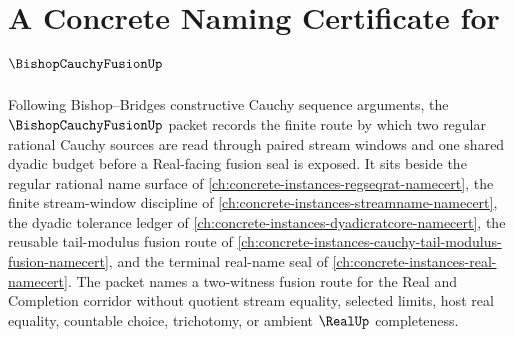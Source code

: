 \chapter{A Concrete Naming Certificate for $\BishopCauchyFusionUp$}
\label{ch:concrete-instances-bishop-cauchy-fusion-namecert}

Following Bishop--Bridges constructive Cauchy sequence arguments, the $\BishopCauchyFusionUp$ packet records the finite route by which two regular rational Cauchy sources are read through paired stream windows and one shared dyadic budget before a Real-facing fusion seal is exposed. It sits beside the regular rational name surface of \autoref{ch:concrete-instances-regseqrat-namecert}, the finite stream-window discipline of \autoref{ch:concrete-instances-streamname-namecert}, the dyadic tolerance ledger of \autoref{ch:concrete-instances-dyadicratcore-namecert}, the reusable tail-modulus fusion route of \autoref{ch:concrete-instances-cauchy-tail-modulus-fusion-namecert}, and the terminal real-name seal of \autoref{ch:concrete-instances-real-namecert}. The packet names a two-witness fusion route for the Real and Completion corridor without quotient stream equality, selected limits, host real equality, countable choice, trichotomy, or ambient $\RealUp$ completeness.


